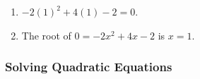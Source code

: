 {\begin{mdframed}[linewidth=4, leftmargin=40, rightmargin=40]
\begin{exercise}
\begin{enumerate}[noitemsep, label=\textbf{Step} \textbf{\arabic*}. ]
        
        \label{m39247*id153229}In this case, the quadratic is a perfect square, so there is only one solution
for \begin{math}x\end{math}: \begin{math}x=1\end{math}.\par 
        \item  
        \label{m39247*id1532632}\begin{math}-2{\left(1\right)}^{2}+4\left(1\right)-2=0\end{math}.
 \par 
        \item  
        \label{m39247*id153262}The root of \begin{math}0=-2{x}^{2}+4x-2\end{math} is \begin{math}x=1\end{math}.
 \par 
        \end{enumerate}
         

    \end{exercise}
    \end{mdframed}
    }
    \noindent
  
\label{m39247*secfhsst!!!underscore!!!id2946}
            \subsubsection{  Solving Quadratic Equations }
            \nopagebreak
            
